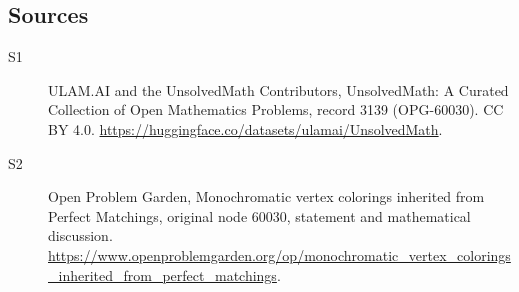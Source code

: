 \documentclass[11pt]{article}
\begin{document}
\subsection{Sources}
\begin{description}
\item[\hypertarget{source:3139:1}{S1}] ULAM.AI and the UnsolvedMath Contributors, UnsolvedMath: A Curated Collection of Open Mathematics Problems, record 3139 (OPG-60030). CC BY 4.0. \url{https://huggingface.co/datasets/ulamai/UnsolvedMath}.
\item[\hypertarget{source:3139:2}{S2}] Open Problem Garden, Monochromatic vertex colorings inherited from Perfect Matchings, original node 60030, statement and mathematical discussion. \url{https://www.openproblemgarden.org/op/monochromatic_vertex_colorings_inherited_from_perfect_matchings}.
\end{description}
\label{end:3139}
\end{document}
